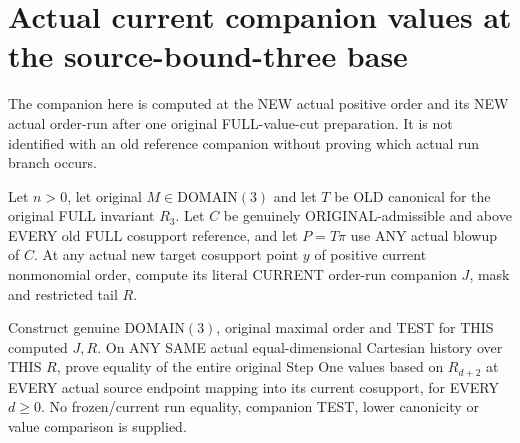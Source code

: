 \section{Actual current companion values at the source-bound-three base}

The companion here is computed at the NEW actual positive order and its
NEW actual order-run after one original FULL-value-cut preparation.
It is not identified with an old reference companion without proving
which actual run branch occurs.

\begin{theorem}
\label{hir:original-prepared-current-companion-stepone-etale-values}
\leanok
Let $n>0$, let original $M\in\mathrm{DOMAIN}(3)$ and let $T$ be OLD
canonical for the original FULL invariant $R_3$. Let $C$ be genuinely
ORIGINAL-admissible and above EVERY old FULL cosupport reference, and
let $P=T\pi$ use ANY actual blowup of $C$. At any actual new target
cosupport point $y$ of positive current nonmonomial order, compute its
literal CURRENT order-run companion $J$, mask and restricted tail $R$.

Construct genuine DOMAIN$(3)$, original maximal order and TEST for
THIS computed $J,R$. On ANY SAME actual equal-dimensional Cartesian
history over THIS $R$, prove equality of the entire original Step One
values based on $R_{d+2}$ at EVERY actual source endpoint mapping into
its current cosupport, for EVERY $d\geq0$. No frozen/current run equality,
companion TEST, lower canonicity or value comparison is supplied.
\end{theorem}
